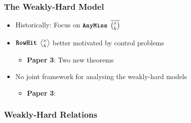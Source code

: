 \begin{frame}
    \frametitle{The Weakly-Hard Model}

    \begin{itemize}\setlength\itemsep{1em}
        \item Historically: Focus on $\texttt{\textbf{AnyMiss}}{}$ $\overline{\binom{x_{}}{k_{}}}$
        \item $\texttt{\textbf{RowHit}}{}$ $\rowhit{}$ better motivated by control problems~\parencite{Linsenmayer:2021,Vreman:2021}
            \begin{itemize}
                \item \textbf{Paper 3}: Two new theorems
            \end{itemize}
        \item No joint framework for analysing the weakly-hard models
            \begin{itemize}
                \item \textbf{Paper 3}: \tool{}
            \end{itemize}
    \end{itemize}
\end{frame}


\begin{frame}
    \frametitle{Weakly-Hard Relations}
    \begin{figure}[h]
        \centering
        \only<2>{}%
        \only<3>{}%
    \end{figure}
\end{frame}


